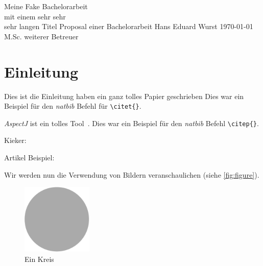 \documentclass[10pt]{book}
\begin{document}
\frontmatter
  \thesistitlepage
    {Meine Fake Bachelorarbeit \\[.1em]mit einem sehr sehr \\[.1em]sehr langen Titel}%
    {Proposal einer Bachelorarbeit}%
    {Hans Eduard Wurst}%
    {\today}%
    {M.Sc. weiterer Betreuer} %

  \tableofcontents{}

\mainmatter


\chapter{Einleitung}
  Dies ist die Einleitung
  \citet{Shaw2003} haben ein ganz tolles Papier geschrieben
  Dies war ein Beispiel für den \textit{natbib} Befehl für \texttt{\textbackslash{}citet\{\}}.
  
  \textit{AspectJ} ist ein tolles Tool~\citep{AspectJ}. Dies war ein Beispiel für den \textit{natbib} Befehl \texttt{\textbackslash{}citep\{\}}.
  
  Kieker: \citep{Rohr2008, Hoorn2009, Hoorn2012}
  
  Artikel Beispiel: \citep{Frey2011}
  
  Wir werden nun die Verwendung von Bildern veranschaulichen (siehe \autoref{fig:figure}).
  
  \begin{figure}[t]%
    \centering%
    \includegraphics[width=0.3\textwidth]{img/template_circle.pdf}%
    \caption{Ein Kreis}%
    \label{fig:figure}%
  \end{figure}%
\end{document}
